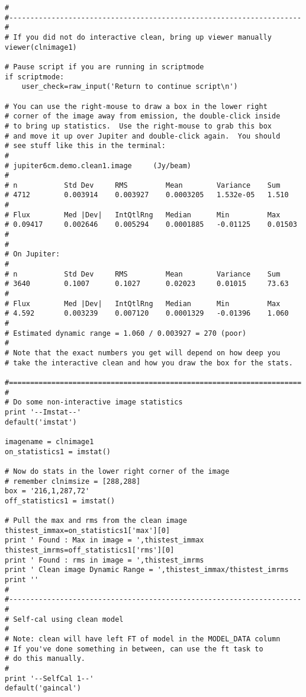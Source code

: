 \begin{verbatim}
#
#---------------------------------------------------------------------
#
# If you did not do interactive clean, bring up viewer manually
viewer(clnimage1)

# Pause script if you are running in scriptmode
if scriptmode:
    user_check=raw_input('Return to continue script\n')

# You can use the right-mouse to draw a box in the lower right
# corner of the image away from emission, the double-click inside
# to bring up statistics.  Use the right-mouse to grab this box
# and move it up over Jupiter and double-click again.  You should
# see stuff like this in the terminal:
#
# jupiter6cm.demo.clean1.image     (Jy/beam)
# 
# n           Std Dev     RMS         Mean        Variance    Sum
# 4712        0.003914    0.003927    0.0003205   1.532e-05   1.510     
# 
# Flux        Med |Dev|   IntQtlRng   Median      Min         Max
# 0.09417     0.002646    0.005294    0.0001885   -0.01125    0.01503   
#
#
# On Jupiter:
#
# n           Std Dev     RMS         Mean        Variance    Sum
# 3640        0.1007      0.1027      0.02023     0.01015     73.63     
# 
# Flux        Med |Dev|   IntQtlRng   Median      Min         Max
# 4.592       0.003239    0.007120    0.0001329   -0.01396    1.060     
#
# Estimated dynamic range = 1.060 / 0.003927 = 270 (poor)
#
# Note that the exact numbers you get will depend on how deep you
# take the interactive clean and how you draw the box for the stats.

#=====================================================================
#
# Do some non-interactive image statistics
print '--Imstat--'
default('imstat')

imagename = clnimage1
on_statistics1 = imstat()

# Now do stats in the lower right corner of the image
# remember clnimsize = [288,288]
box = '216,1,287,72'
off_statistics1 = imstat()

# Pull the max and rms from the clean image
thistest_immax=on_statistics1['max'][0]
print ' Found : Max in image = ',thistest_immax
thistest_imrms=off_statistics1['rms'][0]
print ' Found : rms in image = ',thistest_imrms
print ' Clean image Dynamic Range = ',thistest_immax/thistest_imrms
print ''
#
#---------------------------------------------------------------------
#
# Self-cal using clean model
#
# Note: clean will have left FT of model in the MODEL_DATA column
# If you've done something in between, can use the ft task to
# do this manually.
#
print '--SelfCal 1--'
default('gaincal')


\end{verbatim}
